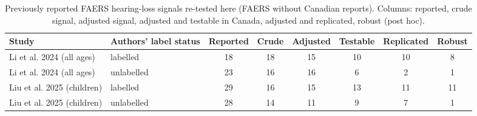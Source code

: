 \documentclass[11pt]{article}
\begin{document}
\begin{table}[t]
\centering\small
\caption{Previously reported FAERS hearing-loss signals re-tested here (FAERS without Canadian reports). Columns: reported,
crude signal, adjusted signal, adjusted and testable in Canada, adjusted and replicated, robust (post hoc).}
\label{tab:prior}
\begin{tabular}{llcccccc}
\toprule
Study & Authors' label status & Reported & Crude & Adjusted & Testable & Replicated & Robust \\
\midrule
Li et al. 2024 (all ages) & labelled & 18 & 18 & 15 & 10 & 10 & 8 \\
Li et al. 2024 (all ages) & unlabelled & 23 & 16 & 16 & 6 & 2 & 1 \\
Liu et al. 2025 (children) & labelled & 29 & 16 & 15 & 13 & 11 & 11 \\
Liu et al. 2025 (children) & unlabelled & 28 & 14 & 11 & 9 & 7 & 1 \\
\bottomrule
\end{tabular}
\end{table}
\end{document}
